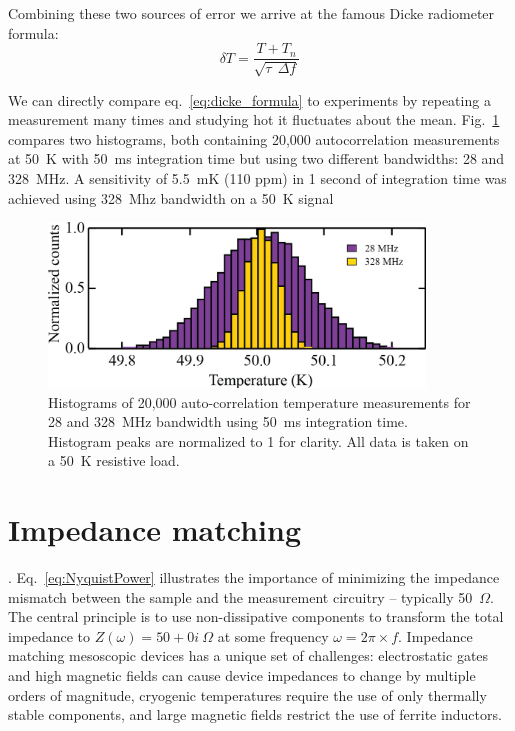 Combining these two sources of error we arrive at the famous Dicke radiometer formula\cite{dicke_measurement_1946}:
\begin{equation}\label{eq:dicke_formula}
\delta T = \frac{T+T_n}{\sqrt{\tau~~\Delta f}}
\end{equation}

We can directly compare eq.~\ref{eq:dicke_formula} to experiments by repeating a measurement many times and studying hot it fluctuates about the mean. Fig.~\ref{fig:JNT_histograms} compares two histograms, both containing 20,000 autocorrelation measurements at 50~K with 50~ms integration time but using two different bandwidths: 28 and 328~MHz. A sensitivity of 5.5~mK (110 ppm) in 1 second of integration time was achieved using 328~Mhz bandwidth on a 50~K signal
\begin{figure}
\centering
\includegraphics[width = 100mm]{figures/Johnson_noise_thermometry/histograms.png}
\caption{Histograms of 20,000 auto-correlation temperature measurements for 28 and 328~MHz bandwidth using 50~ms integration time. Histogram peaks are normalized to 1 for clarity. All data is taken on a 50~K resistive load.}
\label{fig:JNT_histograms}
\end{figure}

\section{Impedance matching}
. Eq.~\ref{eq:NyquistPower} illustrates the importance of minimizing the impedance mismatch between the sample and the measurement circuitry -- typically 50~$\Omega$. The central principle is to use non-dissipative components to transform the total impedance to $Z(\omega) = 50+0i~\Omega$ at some frequency $\omega = 2\pi\times f$. Impedance matching mesoscopic devices has a unique set of challenges: electrostatic gates and high magnetic fields can cause device impedances to change by multiple orders of magnitude, cryogenic temperatures require the use of only thermally stable components, and large magnetic fields restrict the use of ferrite inductors.

